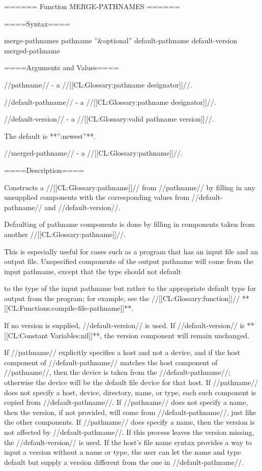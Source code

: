 ====== Function MERGE-PATHNAMES ======

====Syntax====

\DefunWithValuesNewline merge-pathnames {pathname ''&optional'' default-pathname default-version} {merged-pathname}

====Arguments and Values====


//pathname// - a //[[CL:Glossary:pathname designator]]//.

//default-pathname// - a //[[CL:Glossary:pathname designator]]//.


//default-version// - a //[[CL:Glossary:valid pathname version]]//.

The default is **'':newest''**.

//merged-pathname// - a //[[CL:Glossary:pathname]]//.

====Description====

Constructs a //[[CL:Glossary:pathname]]// from //pathname// by filling in any unsupplied components with the corresponding values from //default-pathname// and //default-version//.

Defaulting of pathname components is done by filling in components taken from another //[[CL:Glossary:pathname]]//.

This is especially useful for cases such as a program that has an input file and an output file. Unspecified components of the output pathname will come from the input pathname, except that the type should not default

to the type of the input pathname but rather to the appropriate default type for output from the program; for example, see the //[[CL:Glossary:function]]// **[[CL:Functions:compile-file-pathname]]**.

If no version is supplied, //default-version// is used. If //default-version// is **[[CL:Constant Variables:nil]]**, the version component will remain unchanged.

If //pathname// explicitly specifies a host and not a device, and if the host component of //default-pathname// matches the host component of //pathname//, then the device is taken from the //default-pathname//; otherwise the device will be the default file device for that host. If //pathname// does not specify a host, device, directory, name, or type, each such component is copied from //default-pathname//. If //pathname// does not specify a name, then the version, if not provided, will come from //default-pathname//, just like the other components. If //pathname// does specify a name, then the version is not affected by //default-pathname//. If this process leaves the version missing, the //default-version// is used. If the host's file name syntax provides a way to input a version without a name or type, the user can let the name and type default but supply a version different from the one in //default-pathname//.

